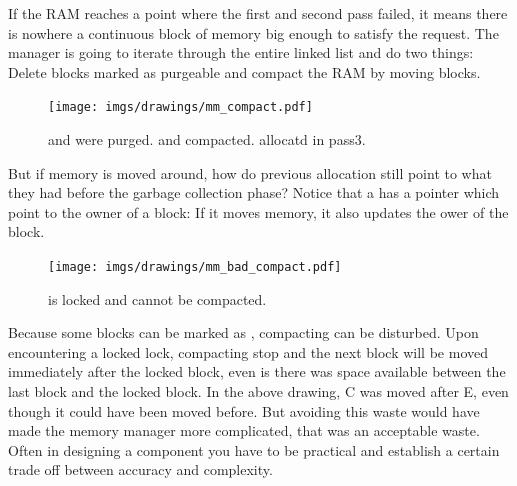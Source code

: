 \documentclass[book.tex]{subfiles}
\begin{document}
 \par
 If the RAM reaches a point where the first and second pass failed, it means there is nowhere a continuous block of memory big enough to satisfy the request. The manager is going to iterate through the entire linked list and do two things: Delete blocks marked as purgeable and compact the RAM by moving blocks.
  \par
\begin{figure}[H]
\centering
 \texttt{[image: imgs/drawings/mm\_compact.pdf]}
  \caption{ and  were purged.  and  compacted.  allocatd in pass3.}
 \end{figure}
 \par
But if memory is moved around, how do previous allocation still point to what they had before the garbage collection phase? Notice that a  has a  pointer which point to the owner of a block: If it moves memory, it also updates the ower of the block.

   \par
\begin{figure}[H]
\centering
 \texttt{[image: imgs/drawings/mm\_bad\_compact.pdf]}
 \caption{ is locked and cannot be compacted.}
 \end{figure}
 \par
 Because some blocks can be marked as , compacting can be disturbed. Upon encountering a locked lock, compacting stop and the next block will be moved immediately after the locked block, even is there was space available between the last block and the locked block. In the above drawing, C was moved after E, even though it could have been moved before. But avoiding this waste would have made the memory manager more complicated, that was an acceptable waste. Often in designing a component you have to be practical and establish a certain trade off between accuracy and complexity.
\end{document}
